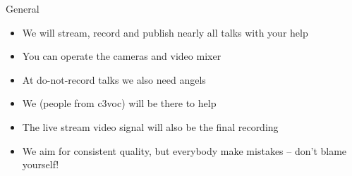 
\begin{frame}{General}
	\begin{itemize}
		\item We will stream, record and publish nearly all talks with your help
		\item You can operate the cameras and video mixer
		\item At do-not-record talks we also need angels %
		\item We (people from c3voc) will be there to help
		\item The live stream video signal will also be the final recording
		\item We aim for consistent quality, but everybody make mistakes -- don't blame yourself!
	\end{itemize}
\end{frame}

